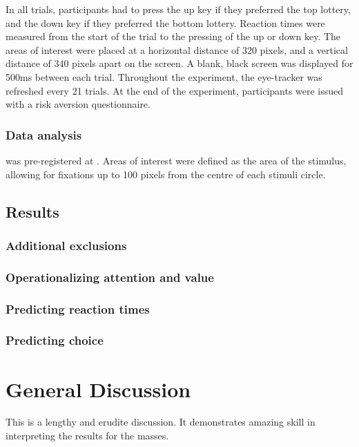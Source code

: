 \documentclass[doc, a4paper, apacite]{apa6}
\begin{document}
In all trials, participants had to press the up key if they preferred the top lottery, and the down key if they preferred the bottom lottery. Reaction times were measured from the start of the trial to the pressing of the up or down key. The areas of interest were placed at a horizontal distance of 320 pixels, and a vertical distance of 340 pixels apart on the screen. A blank, black screen was displayed for 500ms between each trial. Throughout the experiment, the eye-tracker was refreshed every 21 trials. At the end of the experiment, participants were issued with a risk aversion questionnaire.

\subsubsection{Data analysis}
 was pre-registered at \url{}.
Areas of interest were defined as the area of the stimulus, allowing for fixations up to 100 pixels from the centre of each stimuli circle. 

\subsection{Results}

\subsubsection{Additional exclusions}

\subsubsection{Operationalizing attention and value}

\subsubsection{Predicting reaction times}

\subsubsection{Predicting choice}

\section{General Discussion}
This is a lengthy and erudite discussion.  It demonstrates amazing
skill in interpreting the results for the masses.
\end{document}
